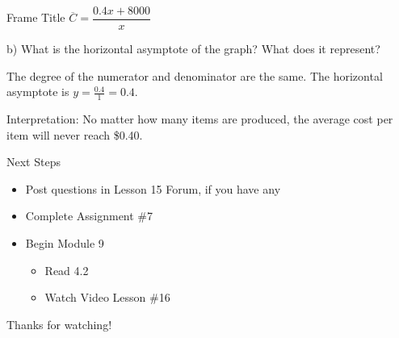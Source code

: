 \documentclass[t]{beamer}
\begin{document}
	\begin{frame}{Frame Title}
		$\overline{C} = \dfrac{0.4x + 8000}{x}$
		
		b) What is the horizontal asymptote of the graph? What does it represent? \pause
		
		The degree of the numerator and denominator are the same. The horizontal asymptote is $y = \frac{0.4}{1} = 0.4$. \pause
		
		Interpretation: No matter how many items are produced, the average cost per item will never reach \$0.40.
	\end{frame}

	\begin{frame}{Next Steps}
		\begin{itemize}
			\item Post questions in Lesson 15 Forum, if you have any
			\item Complete Assignment \#7
			\item Begin Module 9
			\begin{itemize}
				\item Read 4.2
				\item Watch Video Lesson \#16
			\end{itemize}
		\end{itemize}
	
		\vfill
		
		Thanks for watching!
	\end{frame}
\end{document}
